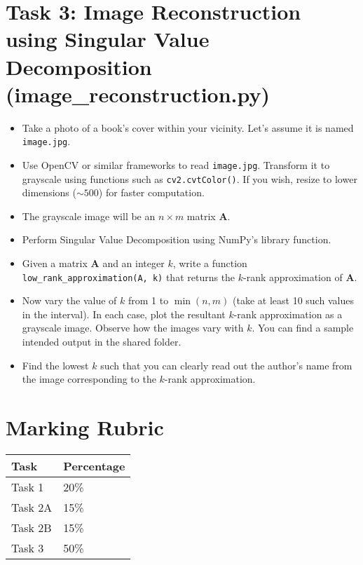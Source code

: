 \documentclass[11pt, a4paper]{article}
\begin{document}
\section{Task 3: Image Reconstruction using Singular Value Decomposition (image\_reconstruction.py)}
\begin{itemize}
    \item Take a photo of a book's cover within your vicinity. Let's assume it is named \texttt{image.jpg}.
    \item Use OpenCV or similar frameworks to read \texttt{image.jpg}. Transform it to grayscale using functions such as \texttt{cv2.cvtColor()}. If you wish, resize to lower dimensions ($\sim 500$) for faster computation.
    \item The grayscale image will be an $n \times m$ matrix $\mathbf{A}$.
    \item Perform Singular Value Decomposition using NumPy's library function.
    \item Given a matrix $\mathbf{A}$ and an integer $k$, write a function \texttt{low\_rank\_approximation(A, k)} that returns the $k$-rank approximation of $\mathbf{A}$.
    \item Now vary the value of $k$ from 1 to $\min(n, m)$ (take at least 10 such values in the interval). In each case, plot the resultant $k$-rank approximation as a grayscale image. Observe how the images vary with $k$. You can find a sample intended output in the shared folder.
    \item Find the lowest $k$ such that you can clearly read out the author's name from the image corresponding to the $k$-rank approximation.
\end{itemize}

\section{Marking Rubric}
\begin{table}[h]
    \centering
    \begin{tabular}{ll}
        \toprule
        \textbf{Task} & \textbf{Percentage} \\
        \midrule
        Task 1 & 20\% \\
        Task 2A & 15\% \\
        Task 2B & 15\% \\
        Task 3 & 50\% \\
        \bottomrule
    \end{tabular}
\end{table}
\end{document}
